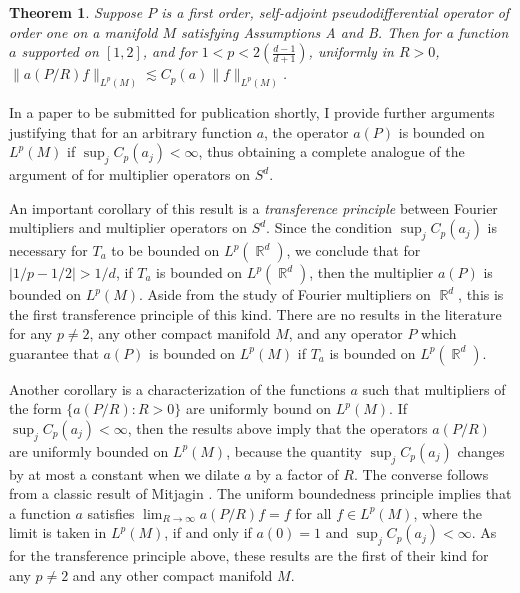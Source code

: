 \documentclass[11pt]{article}
\newtheorem*{theorem}{Theorem}
\DeclareMathOperator{\RR}{\mathbb{R}}
\begin{document}
\begin{theorem} \cite{DensonCharacterization}
	Suppose $P$ is a first order, self-adjoint pseudodifferential operator of order one on a manifold $M$ satisfying Assumptions A and B. Then for a function $a$ supported on $[1,2]$, and for $1 < p < 2 ({\scriptstyle \frac{d-1}{d+1}})$, uniformly in $R > 0$, $\| a(P/R) f \|_{L^p(M)} \lesssim C_p(a) \| f \|_{L^p(M)}$.
\end{theorem}

In a paper to be submitted for publication shortly, I provide further arguments justifying that for an arbitrary function $a$, the operator $a(P)$ is bounded on $L^p(M)$ if $\sup_j C_p(a_j) < \infty$, thus obtaining a complete analogue of the argument of \cite{HeoNazarovSeeger} for multiplier operators on $S^d$.

An important corollary of this result is a \emph{transference principle} between Fourier multipliers and multiplier operators on $S^d$. Since the condition $\sup_j C_p(a_j)$ is necessary for $T_a$ to be bounded on $L^p(\RR^d)$, we conclude that for $|1/p - 1/2| > 1/d$, if $T_a$ is bounded on $L^p(\RR^d)$, then the multiplier $a(P)$ is bounded on $L^p(M)$. Aside from the study of Fourier multipliers on $\RR^d$, this is the first transference principle of this kind. There are no results in the literature for any $p \neq 2$, any other compact manifold $M$, and any operator $P$ which guarantee that $a(P)$ is bounded on $L^p(M)$ if $T_a$ is bounded on $L^p(\RR^d)$.

Another corollary is a characterization of the functions $a$ such that multipliers of the form $\{ a(P/R) : R > 0 \}$ are uniformly bound on $L^p(M)$. If $\sup_j C_p(a_j) < \infty$, then the results above imply that the operators $a(P/R)$ are uniformly bounded on $L^p(M)$, because the quantity $\sup_j C_p(a_j)$ changes by at most a constant when we dilate $a$ by a factor of $R$. The converse follows from a classic result of Mitjagin \cite{Mitjagin}.
The uniform boundedness principle implies that a function $a$ satisfies $\lim_{R \to \infty} a(P/R) f = f$ for all $f \in L^p(M)$, where the limit is taken in $L^p(M)$, if and only if $a(0) = 1$ and $\sup_j C_p(a_j) < \infty$. As for the transference principle above, these results are the first of their kind for any $p \neq 2$ and any other compact manifold $M$.
\end{document}
